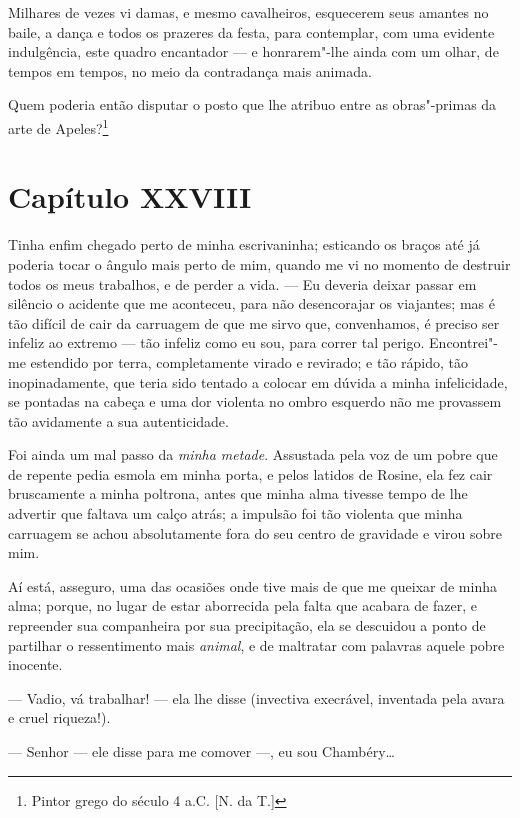  Milhares de vezes vi damas, e mesmo cavalheiros, esquecerem seus
amantes no baile, a dança e todos os prazeres da festa, para
contemplar, com uma evidente indulgência, este quadro encantador --- e
honrarem"-lhe ainda com um olhar, de tempos em tempos, no meio da
contradança mais animada.

 Quem poderia então disputar o posto que lhe atribuo entre as
obras"-primas da arte de Apeles?\footnote{ Pintor grego do século 4 a.C. [N. da T.]} 

\section*{Capítulo XXVIII}

 Tinha enfim chegado perto de minha escrivaninha; esticando os braços
até já poderia tocar o ângulo mais perto de mim, quando me vi no
momento de destruir todos os meus trabalhos, e de perder a vida. --- Eu
deveria deixar passar em silêncio o acidente que me aconteceu, para não
desencorajar os viajantes; mas é tão difícil de cair da carruagem de
que me sirvo que, convenhamos, é preciso ser infeliz ao extremo ---
tão infeliz como eu sou, para correr tal perigo. Encontrei"-me estendido
por terra, completamente virado e revirado; e tão rápido, tão
inopinadamente, que teria sido tentado a colocar em dúvida a minha
infelicidade, se pontadas na cabeça e uma dor violenta no ombro
esquerdo não me provassem tão avidamente a sua autenticidade.

 Foi ainda um mal passo da \textit{minha metade}. Assustada pela voz de
um pobre que de repente pedia esmola em minha porta, e pelos latidos de
Rosine, ela fez cair bruscamente a minha poltrona, antes que minha alma
tivesse tempo de lhe advertir que faltava um calço atrás; a impulsão
foi tão violenta que minha carruagem se achou absolutamente fora do seu
centro de gravidade e virou sobre mim.

 Aí está, asseguro, uma das ocasiões onde tive mais de que me queixar de
minha alma; porque, no lugar de estar aborrecida pela falta que acabara
de fazer, e repreender sua companheira por sua precipitação, ela se
descuidou a ponto de partilhar o ressentimento mais \textit{animal}, e
de maltratar com palavras aquele pobre inocente.

 --- Vadio, vá trabalhar! --- ela lhe disse (invectiva execrável,
inventada pela avara e cruel riqueza!).

 --- Senhor --- ele disse para me comover ---, eu sou Chambéry\ldots

